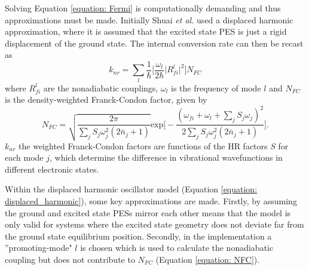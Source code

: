 Solving Equation \ref{equation: Fermi} is computationally demanding and thus approximations must be made. Initially Shuai \textit{et al.} used a displaced harmonic approximation, where it is assumed that the excited state \ac{PES} is just a rigid displacement of the ground state.\cite{Yui2005} The internal conversion rate can then be recast as
\begin{equation} \label{equation: displaced_harmonic}
    k_{nr}=\sum_{l}\frac{1}{\hbar}\bigg[\frac{\omega_{l}}{2\hbar{}}\big|R_{fi}^{l}\big|^{2}\bigg]N_{FC}
\end{equation}
where $R^{l}_{fi}$ are the nonadiabatic couplings, $\omega_{l}$ is the frequency of mode $l$ and $N_{FC}$ is the density-weighted Franck-Condon factor, given by
\begin{equation}\label{equation: NFC}
N_{FC}=\sqrt{\frac{2\pi}{\sum_{j}S_{j}\omega^{2}_{j}(2\bar{n}_{j}+1)}}\mathrm{exp}\bigg[-\frac{(\omega_{fi}+\omega_{l}+\sum_{j}S_{j}\omega_{j})^{2}}{2\sum_{j}S_{j}\omega_{j}^{2}(2\bar{n}_{j}+1)}\bigg].
\end{equation}
$k_{nr}$ the weighted Franck-Condon factors are functions of the \ac{HR} factors $S$ for each mode $j$, which determine the difference in vibrational wavefunctions in different electronic states. 

Within the displaced harmonic oscillator model (Equation \ref{equation: displaced_harmonic}), some key approximations are made. Firstly, by assuming the ground and excited state \acp{PES} mirror each other means that the model is only valid for systems where the excited state geometry does not deviate far from the ground state equilibrium position. Secondly, in the implementation a ''promoting-mode" $l$ is chosen which is used to calculate the nonadiabatic coupling but does not contribute to $N_{FC}$ (Equation \ref{equation: NFC}). 

